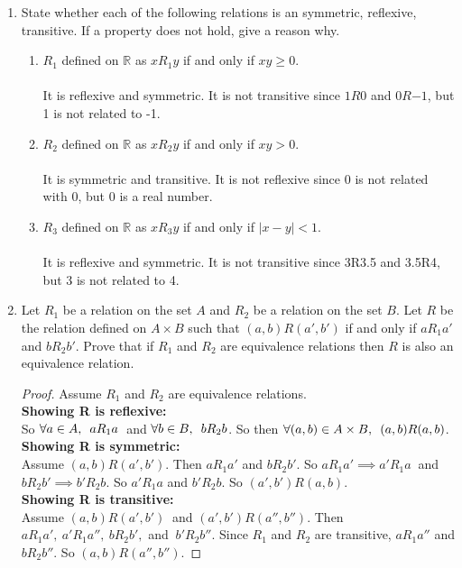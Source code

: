 \documentclass[12pt]{article}
\begin{document}
\begin{enumerate}
\item State whether each of the following relations is an symmetric, reflexive, transitive. If a property does not hold, give a reason why.
\begin{enumerate}
\item $R_1$ defined on $\mathbb R$ as $x R_1 y$ if and only if $xy \geq 0$.\\\\
It is reflexive and symmetric. It is not transitive since $1R0$ and $0R{-1}$, but 1 is not related to -1.\medskip
\item $R_2$ defined on $\mathbb R$ as $x R_2 y$ if and only if $xy > 0$.\\\\
It is symmetric and transitive. It is not reflexive since 0 is not related with 0, but 0 is a real number. \medskip
\item $R_3$ defined on $\mathbb R$ as $x R_3 y$ if and only if $|x-y|<1$.\\\\
It is reflexive and symmetric. It is not transitive since 3R3.5 and 3.5R4, but 3 is not related to 4.
\end{enumerate}


\medskip


\item Let $R_1$ be a relation on the set $A$ and $R_2$ be a relation on the set $B$. Let $R$ be the relation defined on $A \times B$ such that $(a,b) R (a',b')$ if and only if $aR_1a'$ and $bR_2b'$. Prove that if $R_1$ and $R_2$ are equivalence relations then $R$ is also an equivalence relation.
\begin{proof}
	Assume $R_1$ and $R_2$ are equivalence relations.\\
	\textbf{Showing R is reflexive:}\\
	So $\forall a\in A,\enskip aR_1a\medspace$ and $\forall b\in B,\enskip bR_2b$. So then $\forall (a,b)\in A\times B,\enskip (a,b)R(a,b)$.\\
	\textbf{Showing R is symmetric:}\\
	Assume $(a,b)R(a',b')$. Then $aR_1a'$ and $bR_2b'$.
	So $aR_1a' \implies a'R_1a\medspace$ and $bR_2b' \implies b'R_2b.$ So $a'R_1a$ and $b'R_2b$. So $(a',b')R(a,b)$.\\
	\textbf{Showing R is transitive:}\\
	Assume $(a,b)R(a',b')\medspace$ and $(a',b')R(a'',b'')$. Then $aR_1a',
	\medspace a'R_1a'', \medspace bR_2b', $ and $\medspace b'R_2b''$. Since $R_1$ and $R_2$ are transitive, $aR_1a''$ and $bR_2b''$. So $(a,b)R(a'',b'')$.
\end{proof}


\end{enumerate}
\end{document}
